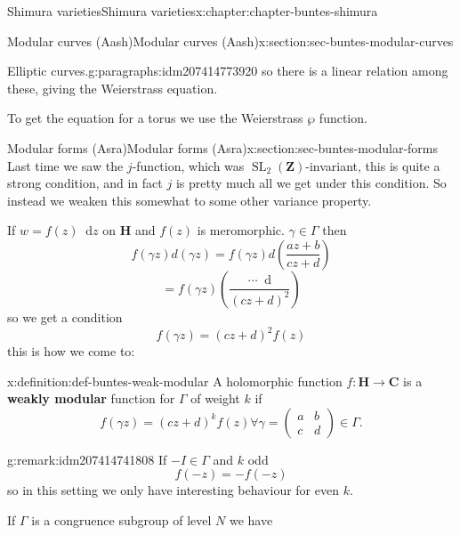 \documentclass[oneside,10pt,]{book}
\newcommand{\terminology}[1]{\textbf{#1}}
\numberwithin{equation}{section}
\newcommand{\diff}{\mathop{}\!\mathrm{d}}
\newcommand{\ZZ}{\mathbf{Z}}
\newcommand{\CC}{\mathbf{C}}
\newcommand{\HH}{\mathbf{H}}
\DeclareMathOperator{\SL}{SL}
\newcommand{\amp}{&}
\begin{document}
\begin{chapterptx}{Shimura varieties}{}{Shimura varieties}{}{}{x:chapter:chapter-buntes-shimura}
\begin{sectionptx}{Modular curves (Aash)}{}{Modular curves (Aash)}{}{}{x:section:sec-buntes-modular-curves}
\begin{paragraphs}{Elliptic curves.}{g:paragraphs:idm207414773920}
so there is a linear relation among these, giving the Weierstrass equation.%
\par
To get the equation for a torus we use the Weierstrass \(\wp\) function.%
\end{paragraphs}%
\end{sectionptx}
%
%
\typeout{************************************************}
\typeout{************************************************}
%
\begin{sectionptx}{Modular forms (Asra)}{}{Modular forms (Asra)}{}{}{x:section:sec-buntes-modular-forms}
Last time we saw the \(j\)-function, which was \(\SL_2(\ZZ)\)-invariant, this is quite a strong condition, and in fact \(j\) is pretty much all we get under this condition. So instead we weaken this somewhat to some other variance property.%
\par
If \(w = f(z) \diff z\) on \(\HH\) and \(f(z)\) is meromorphic. \(\gamma \in \Gamma\) then%
\begin{equation*}
f(\gamma z) d(\gamma z) = f(\gamma z) d\left( \frac{az+b}{cz+d} \right)
\end{equation*}
%
\begin{equation*}
= f(\gamma z) \left( \frac{\cdots \diff }{(cz+d)^2} \right)
\end{equation*}
so we get a condition%
\begin{equation*}
f(\gamma z) = (cz+d)^2 f(z)
\end{equation*}
this is how we come to:%
\begin{definition}{}{x:definition:def-buntes-weak-modular}%
A holomorphic function \(f\colon \HH \to \CC\) is a \terminology{weakly modular} function for \(\Gamma\) of weight \(k\) if%
\begin{equation*}
f(\gamma z) = (cz+d)^k f(z) \forall \gamma  = \begin{pmatrix} a\amp b \\ c \amp d    \end{pmatrix} \in \Gamma\text{.}
\end{equation*}
%
\end{definition}
\begin{remark}{}{g:remark:idm207414741808}%
If \(-I \in \Gamma\) and \(k\) odd%
\begin{equation*}
f(-z)  = - f(-z)
\end{equation*}
so in this setting we only have interesting behaviour for even \(k\).%
\par
If \(\Gamma\) is a congruence subgroup of level \(N\) we have%

\end{remark}
\end{sectionptx}
\end{chapterptx}
\end{document}
